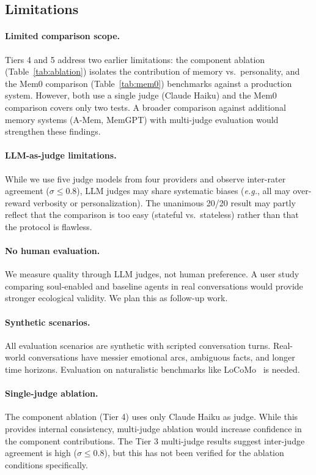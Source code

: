 \documentclass{article}
\newcommand{\eg}{\textit{e.g.}}
\begin{document}
\subsection{Limitations}

\paragraph{Limited comparison scope.} Tiers 4 and 5 address two earlier limitations: the component ablation (Table~\ref{tab:ablation}) isolates the contribution of memory vs.\ personality, and the Mem0 comparison (Table~\ref{tab:mem0}) benchmarks against a production system. However, both use a single judge (Claude Haiku) and the Mem0 comparison covers only two tests. A broader comparison against additional memory systems (A-Mem, MemGPT) with multi-judge evaluation would strengthen these findings.

\paragraph{LLM-as-judge limitations.} While we use five judge models from four providers and observe inter-rater agreement ($\sigma \leq 0.8$), LLM judges may share systematic biases (\eg{}, all may over-reward verbosity or personalization). The unanimous 20/20 result may partly reflect that the comparison is too easy (stateful vs.\ stateless) rather than that the protocol is flawless.

\paragraph{No human evaluation.} We measure quality through LLM judges, not human preference. A user study comparing soul-enabled and baseline agents in real conversations would provide stronger ecological validity. We plan this as follow-up work.

\paragraph{Synthetic scenarios.} All evaluation scenarios are synthetic with scripted conversation turns. Real-world conversations have messier emotional arcs, ambiguous facts, and longer time horizons. Evaluation on naturalistic benchmarks like LoCoMo~\cite{maharana2024locomo} is needed.

\paragraph{Single-judge ablation.} The component ablation (Tier 4) uses only Claude Haiku as judge. While this provides internal consistency, multi-judge ablation would increase confidence in the component contributions. The Tier 3 multi-judge results suggest inter-judge agreement is high ($\sigma \leq 0.8$), but this has not been verified for the ablation conditions specifically.
\end{document}
